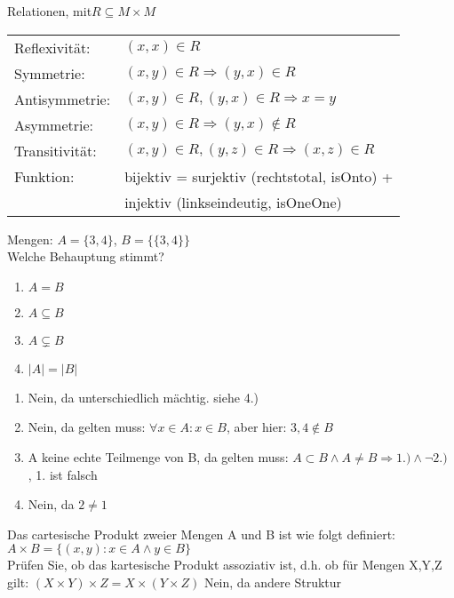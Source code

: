 \begin{card}
	Relationen, mit$R \subseteq M \times M$\\
	\begin{tabular}{ll}
		Reflexivität:& $(x, x) \in R $\\
		Symmetrie:&	$(x, y) \in R \Rightarrow (y, x) \in R$\\
		Antisymmetrie:& $(x, y) \in R, (y, x) \in R \Rightarrow x=y$\\
		Asymmetrie:& $(x, y) \in R \Rightarrow (y, x) \notin R$\\
		Transitivität:& $(x, y) \in R, (y, z) \in R \Rightarrow (x, z) \in R$\\
		Funktion: & bijektiv = surjektiv (rechtstotal, isOnto) +\\
	     	      & injektiv (linkseindeutig, isOneOne)
		\end{tabular}
\end{card}

\begin{card}
	Mengen: $A = \{3, 4\}$, $B = \{\{3, 4\}\}$\\Welche Behauptung stimmt?
	\begin{enumerate}
	\item $A = B$
	\item $A \subseteq B$
	\item $A \subsetneq B$
	\item $|A| = |B|$
	\end{enumerate}
	\hr
	\begin{enumerate}
	\item Nein, da unterschiedlich mächtig. siehe 4.)
	\item Nein, da gelten muss: $\forall x \in A: x \in B$, aber hier: $3,4 \notin B$ 
	\item A keine echte Teilmenge von B, da gelten muss: $A \subset B \land A \neq B \Rightarrow 1.) \land \lnot 2.)$ , 1. ist falsch
	\item Nein, da $2 \neq 1$
	\end{enumerate}
\end{card}

\begin{card}
	Das cartesische Produkt zweier Mengen A und B ist wie folgt definiert:
	$A \times B = \{(x,y):x	\in	A \land	y \in B\}$\\
	Prüfen Sie, ob das kartesische Produkt assoziativ ist, d.h. ob für Mengen X,Y,Z gilt:
	$(X	\times Y)\times Z=X \times(Y \times Z)$
	\hr
	Nein, da andere Struktur
\end{card}

